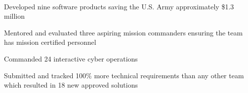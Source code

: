 \documentclass[]{resume}
\begin{document}
\begin{minipage}[t]{0.69\textwidth}
 \\
\begin{tightemize}
\item Developed nine software products saving the U.S. Army approximately \$1.3 million
\item Mentored and evaluated three aspiring mission commanders ensuring the team has mission certified personnel
\item Commanded 24 interactive cyber operations
\item Submitted and tracked 100\% more technical requirements than any other team which resulted in 18 new approved solutions
\end{tightemize}

\sectionsep



\end{minipage}
\end{document}
